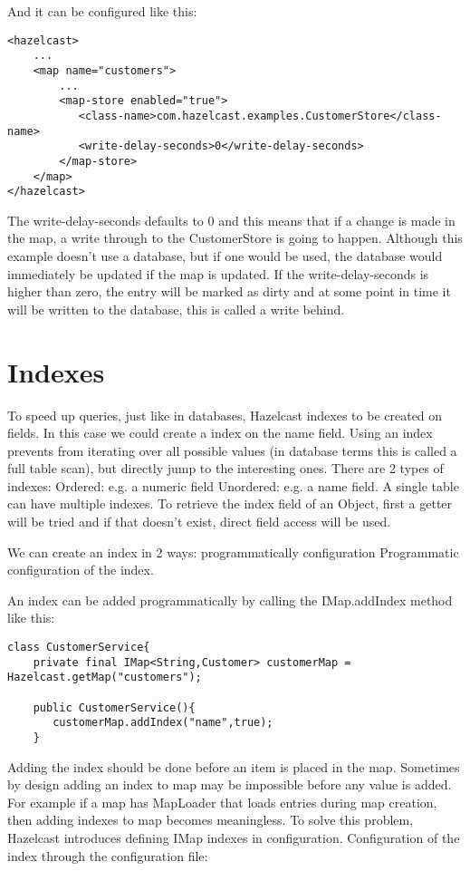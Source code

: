 And it can be configured like this:

\begin{verbatim}
<hazelcast>
    ...
    <map name="customers">
        ...
        <map-store enabled="true">
           <class-name>com.hazelcast.examples.CustomerStore</class-name>
           <write-delay-seconds>0</write-delay-seconds>
        </map-store>
    </map>
</hazelcast>
\end{verbatim}

The write-delay-seconds defaults to 0 and this means that if a change is made in the map, a write through to the CustomerStore is going to happen. Although this example doesn't use a database, but if one would be used, the database would immediately be updated if the map is updated. If the write-delay-seconds is higher than zero, the entry will be marked as dirty and at some point in time it will be written to the database, this is called a write behind.

\section{Indexes}

To speed up queries, just like in databases, Hazelcast indexes to be created on fields. In this case we could create a index on the name field. Using an index prevents from iterating over all possible values (in database terms this is called a full table scan), but directly jump to the interesting ones. There are 2 types of indexes:
Ordered: e.g. a numeric field
Unordered: e.g. a name field.
A single table can have multiple indexes. To retrieve the index field of an Object, first a getter will be tried and if that doesn't exist, direct field access will be used.

We can create an index in 2 ways:
programmatically
configuration
Programmatic configuration of the index.

An index can be added programmatically by calling the IMap.addIndex method like this:

\begin{verbatim}
class CustomerService{
    private final IMap<String,Customer> customerMap = Hazelcast.getMap("customers");

    public CustomerService(){
       customerMap.addIndex("name",true);
    }
\end{verbatim}

Adding the index should be done before an item is placed in the map. Sometimes by design adding an index to map may be impossible before any value is added. For example if a map has MapLoader that loads entries during map creation, then adding indexes to map becomes meaningless. To solve this problem, Hazelcast introduces defining IMap indexes in configuration.
Configuration of the index through the configuration file:

